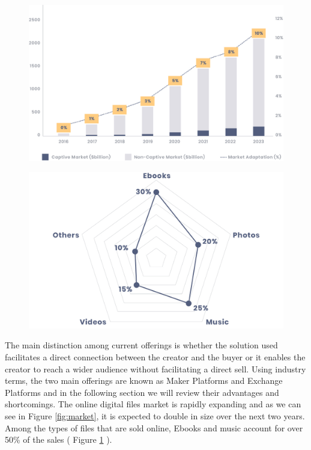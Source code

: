 \begin{figure}[!bp]
\centering
\begin{minipage}{.5\textwidth}
  \centering
  \includegraphics[width=0.8\linewidth]{./figures/fig1.jpg}
  \label{fig:market}
\end{minipage}%
\begin{minipage}{.5\textwidth}
  \centering
  \includegraphics[width=0.8\linewidth]{./figures/fig2.jpg}
  \label{fig:file_categories}
\end{minipage} 
\end{figure}


The main distinction among current offerings is whether the solution used facilitates a direct connection between the creator and the buyer or it enables the creator to reach a wider audience without facilitating a direct sell. Using industry terms, the two main offerings are known as Maker Platforms and Exchange Platforms and in the following section we will review their advantages and shortcomings.
The online digital files market is rapidly expanding and as we can see in Figure \ref{fig:market}, it is expected to double in size over the next two years. Among the types of files that are sold online, Ebooks and music account for over 50\% of the sales ( Figure \ref{fig:file_categories} ). 
 


